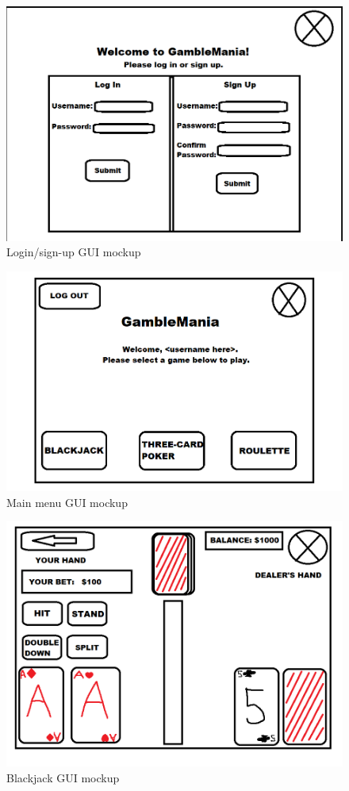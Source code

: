 \documentclass[10pt,conference,onecolumn,compsoc]{IEEEtran}
\begin{document}
\begin{figure}[h]
\caption{Login/sign-up GUI mockup}
\includegraphics[scale=0.4]{login}
\centering
\end{figure}

\begin{figure}[h]
\caption{Main menu GUI mockup}
\includegraphics[scale=0.4]{main}
\centering
\end{figure}

\begin{figure}[h]
\caption{Blackjack GUI mockup}
\includegraphics[scale=0.4]{blackjack}
\centering
\end{figure}
\end{document}
